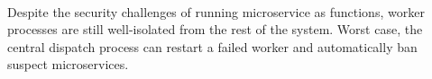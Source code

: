 
~\\
Despite the security challenges of running microservice as functions, worker
processes are still well-isolated from the rest of the system.
Worst case, the central dispatch process can restart a failed worker and
automatically ban suspect microservices.
